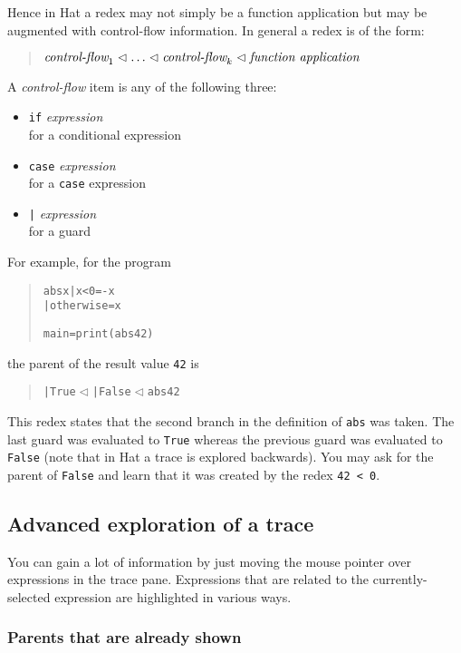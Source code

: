 \documentclass[12pt]{article}
\newenvironment{code}{\begin{quote}\begin{alltt}}{\end{alltt}\end{quote}}
\newcommand{\within}{\vartriangleleft}
\begin{document}
Hence in Hat a redex may not simply be a function application but may be augmented with control-flow information. In general a redex is of the form:
\begin{quote}
$\emph{control-flow}_1 \within \ldots \within \emph{control-flow}_k 
\within \emph{function application}$
\end{quote}
A \emph{control-flow} item is any of the following three:
\begin{itemize}
\item \texttt{if} \emph{expression}\\
for a conditional expression
\item \texttt{case} \emph{expression}\\
for a \texttt{case} expression
\item \texttt{|} \emph{expression}\\
for a guard
\end{itemize}
%
For example, for the program
\begin{code} 
abs x | x < 0 = -x
      | otherwise = x 

main = print (abs 42)
\end{code}
the parent of the result value \texttt{42} is
\begin{code}
| True \(\within\) | False \(\within\) abs 42
\end{code}
This redex states that the second branch in the definition of \texttt{abs} was taken. The last guard was evaluated to \texttt{True} whereas the previous guard was evaluated to \texttt{False} (note that in Hat a trace is explored backwards). You may ask for the parent of \texttt{False} and learn that it was created by the redex \texttt{42 < 0}.


\subsection{Advanced exploration of a trace}\label{advanced}

You can gain a lot of information by just moving the mouse pointer over expressions in the trace pane. Expressions that are related to the currently-selected expression are highlighted in various ways.

\subsubsection{Parents that are already shown}
\end{document}
